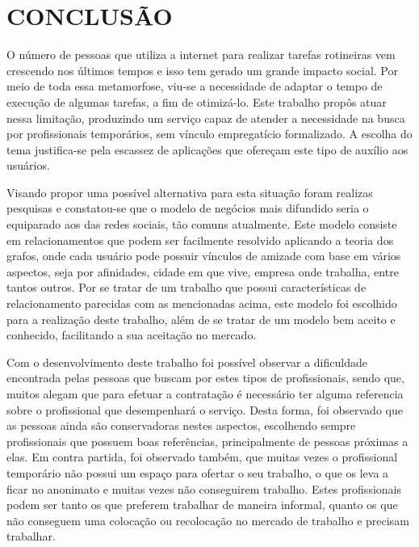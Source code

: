 \chapter{CONCLUSÃO} 


\par O número de pessoas que utiliza a internet para realizar tarefas rotineiras vem crescendo nos últimos tempos e isso tem gerado um grande impacto social. Por meio de toda essa metamorfose, viu-se a necessidade de adaptar o tempo de execução de algumas tarefas, a fim de otimizá-lo.  Este trabalho propôs atuar nessa limitação, produzindo um serviço capaz de atender a necessidade na busca por profissionais temporários, sem vínculo empregatício formalizado. A escolha do tema justifica-se pela escassez de aplicações que ofereçam este tipo de auxílio aos usuários.

\par Visando propor uma possível alternativa para esta situação foram realizas pesquisas e constatou-se que o modelo de negócios mais difundido seria o equiparado aos das redes sociais, tão comuns atualmente. Este modelo consiste em relacionamentos que podem ser facilmente resolvido aplicando a teoria dos grafos, onde cada usuário pode possuir vínculos de amizade com base em vários aspectos, seja por afinidades, cidade em que vive, empresa onde trabalha, entre tantos outros. Por se tratar de um trabalho que possui características de relacionamento parecidas com as mencionadas acima, este modelo foi escolhido para a realização deste trabalho, além de se tratar de um modelo bem aceito e conhecido, facilitando a sua aceitação no mercado.

\par Com o desenvolvimento deste trabalho foi possível observar a dificuldade encontrada pelas pessoas que buscam por estes tipos de profissionais, sendo que, muitos alegam que para efetuar a contratação é necessário ter alguma referencia sobre o profissional que desempenhará o serviço. Desta forma, foi observado que as pessoas ainda são conservadoras nestes aspectos, escolhendo sempre profissionais que possuem boas referências, principalmente de pessoas próximas a elas. Em contra partida, foi observado também, que muitas vezes o profissional temporário não possui um espaço para ofertar o seu trabalho, o que os leva a ficar no anonimato e muitas vezes não conseguirem trabalho. Estes profissionais podem ser tanto os que preferem trabalhar de maneira informal, quanto os que não conseguem uma colocação ou recolocação no mercado de trabalho e precisam trabalhar.


